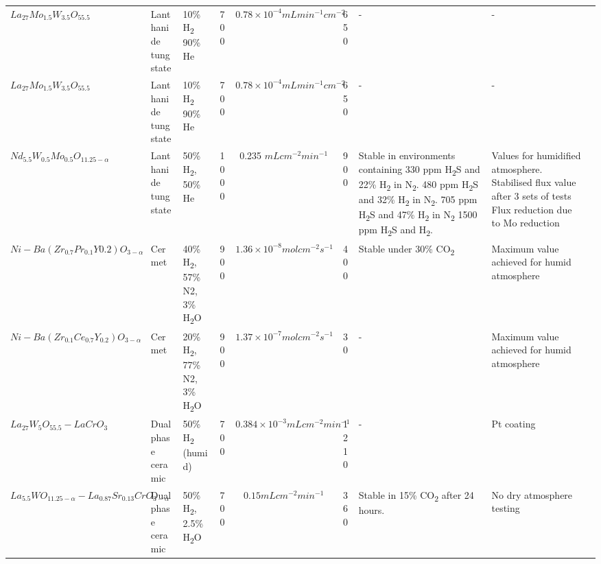 \begin{longtable}{@{}C{5cm} C{2cm} C{4cm} ccc C{6cm} C{5cm} C{0.5cm} @{}}
\\ $La_{27} Mo_{1.5} W_{3.5} O_{55.5}$
	& Lanthanide tungstate
	& 10\% H\textsubscript{2} 90\% He
	& 700
	& $ 0.78 \times 10^{−4} mL min^{-1} cm^{-2}$
	& 650
    & -
    & -	
    & \cite{Vollestad2014}

    \\ $La_{27} Mo_{1.5} W_{3.5} O_{55.5}$
	& Lanthanide tungstate
	& 10\% H\textsubscript{2} 90\% He
	& 700
	& $ 0.78 \times 10^{−4} mL min^{-1} cm^{-2}$
	& 650
    & -
    & -	
    & \cite{Vollestad2014}

\\ $Nd_{5.5} W_{0.5} Mo_{0.5} O_{11.25-\alpha}$
	& Lanthanide tungstate
	& 50\% H\textsubscript{2}, 50\% He
	& 1000
	& 0.235 $mL cm^{-2} min^{-1}$
	& 900
    & Stable in environments containing 330 ppm H\textsubscript{2}S and 22\% H\textsubscript{2} in N\textsubscript{2}. 480 ppm H\textsubscript{2}S and 32\% H\textsubscript{2} in N\textsubscript{2}. 705 ppm H\textsubscript{2}S and 47\% H\textsubscript{2} in N\textsubscript{2} 1500 ppm H\textsubscript{2}S and H\textsubscript{2}. 
    & Values for humidified atmosphere. Stabilised flux value after 3 sets of tests Flux reduction due to Mo reduction
	& \cite{Escolastico2015}

\\ $Ni-Ba(Zr_{0.7}Pr_{0.1}Y{0.2})O_{3-\alpha}$
	& Cermet
	& 40\% H\textsubscript{2}, 57\% N2, 3\% H\textsubscript{2}O
	& 900
	& $1.36 \times 10^{−8} mol cm^{-2} s^{-1}$
	& 400
    & Stable under 30\% CO\textsubscript{2} 
    & Maximum value achieved for humid atmosphere	
    & \cite{Zhu2014}

\\ $Ni-Ba(Zr_{0.1}Ce_{0.7}Y_{0.2})O_{3-\alpha}$	
    & Cermet	
    & 20\% H\textsubscript{2}, 77\% N2, 3\% H\textsubscript{2}O	
    & 900	
    & $1.37 \times 10^{-7} mol cm^{-2} s^{-1}$	
    & 30	
    & -	
    & Maximum value achieved for humid atmosphere	
    & \cite{Zhu2011}

\\ $La_{27}W_5O_{55.5}-LaCrO_3$	
    & Dual phase ceramic	
    & 50\% H\textsubscript{2} (humid)	
    & 700	
    & $0.384 \times 10^{-3} mL cm^{-2} min^{-1}$	
    & 1210	
    & -	
    & Pt coating	
    & \cite{Polfus2015}
 
\\ $La_{5.5}WO_{11.25-\alpha}-La_{0.87}Sr_{0.13}CrO_{3-\alpha}$	
    & Dual phase ceramic	
    & 50\% H\textsubscript{2}, 2.5\%H\textsubscript{2}O	
    & 700	
    & $0.15 mL cm^{-2} min^{-1}$	
    & 360	
    & Stable in 15\% CO\textsubscript{2} after 24 hours. 
    & No dry atmosphere testing	
    & \cite{Escolastico2014}


\end{longtable}
